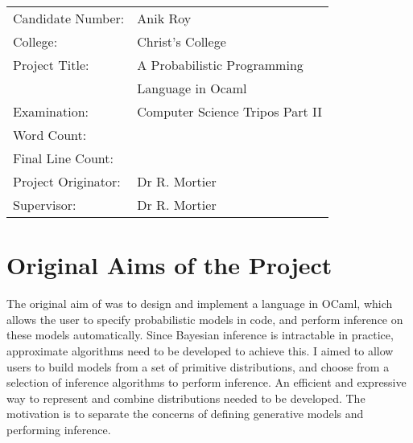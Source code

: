 \immediate{}
\immediate{}

{\large
	\begin{tabular}{ll}
		Candidate Number:   & Anik Roy                              \\
		College:            & Christ's College                      \\
		Project Title:      & A Probabilistic Programming           \\
		                    & Language in Ocaml                     \\
		Examination:        & Computer Science Tripos Part II       \\
		Word Count:         & \footnotemark[1] \\
		Final Line Count:   & \footnotemark[2] \\
		Project Originator: & Dr R. Mortier                         \\
		Supervisor:         & Dr R. Mortier                         \\ 
	\end{tabular} 
}


\section*{Original Aims of the Project}

The original aim of was to design and implement a language in OCaml, which allows the user to specify probabilistic models in code, and perform inference on these models automatically. Since Bayesian inference is intractable in practice, approximate algorithms need to be developed to achieve this. I aimed to allow users to build models from a set of primitive distributions, and choose from a selection of inference algorithms to perform inference. An efficient and expressive way to represent and combine distributions needed to be developed. The motivation is to separate the concerns of defining generative models and performing inference.

